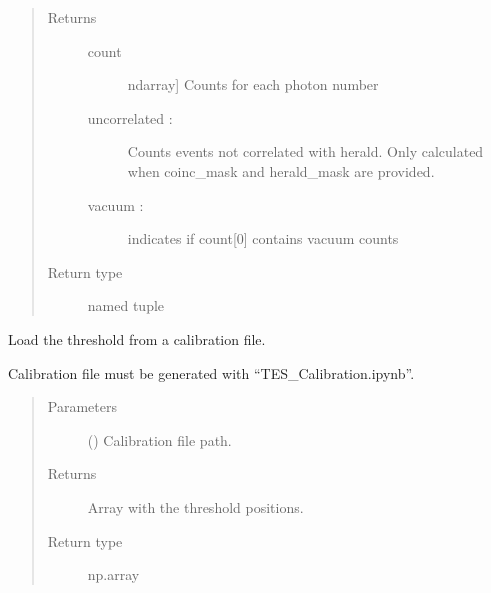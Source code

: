\documentclass[letterpaper,10pt,english]{sphinxmanual}
\begin{document}
\begin{fulllineitems}
\begin{quote}
\begin{description}
\begin{itemize}
\end{itemize}

\item[{Returns}] \leavevmode
\sphinxAtStartPar

\sphinxAtStartPar
{} \textendash{}
\begin{description}
\item[{count}] \leavevmode{[}ndarray{]}
\sphinxAtStartPar
Counts for each photon number

\item[{uncorrelated :}] \leavevmode
\sphinxAtStartPar
Counts events not correlated with herald.
Only calculated when coinc\_mask and herald\_mask are
provided.

\item[{vacuum :}] \leavevmode
\sphinxAtStartPar
indicates if count{[}0{]} contains vacuum counts

\end{description}


\item[{Return type}] \leavevmode
\sphinxAtStartPar
named tuple

\end{description}\end{quote}

\end{fulllineitems}


\begin{fulllineitems}
\label{\detokenize{tes:tes.counts.get_thresholds}}
\sphinxAtStartPar
Load the threshold from a calibration file.

\sphinxAtStartPar
Calibration file must be generated with “TES\_Calibration.ipynb”.
\begin{quote}\begin{description}
\item[{Parameters}] \leavevmode
\sphinxAtStartPar
{} () \textendash{} Calibration file path.

\item[{Returns}] \leavevmode
\sphinxAtStartPar
{} \textendash{} Array with the threshold positions.

\item[{Return type}] \leavevmode
\sphinxAtStartPar
np.array

\end{description}\end{quote}

\end{fulllineitems}
\end{document}
